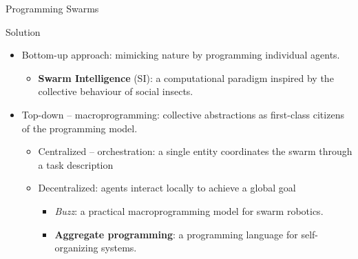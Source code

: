 \documentclass[aspectratio=169]{beamer}
\begin{document}
	\begin{frame}{Programming Swarms}
		\begin{exampleblock}{Solution}
			\begin{itemize}
					\item Bottom-up approach: mimicking nature by programming individual agents.
					\begin{itemize}
						\item \textbf{Swarm Intelligence} (SI): a computational paradigm inspired by the collective behaviour of social insects.
					\end{itemize}
					\item Top-down -- macroprogramming: collective abstractions as first-class citizens of the programming model.
					\begin{itemize}
						\item \alert{Centralized -- orchestration}: a single entity coordinates the swarm through a task description
						\item \alert{Decentralized}: agents interact locally to achieve a global goal
						\begin{itemize}
							\item \emph{Buzz}: a practical macroprogramming model for swarm robotics.
							\item \textbf{Aggregate programming}: a programming language for self-organizing systems.
						\end{itemize}
					\end{itemize}
			\end{itemize}
		\end{exampleblock}
	\end{frame}
\end{document}
